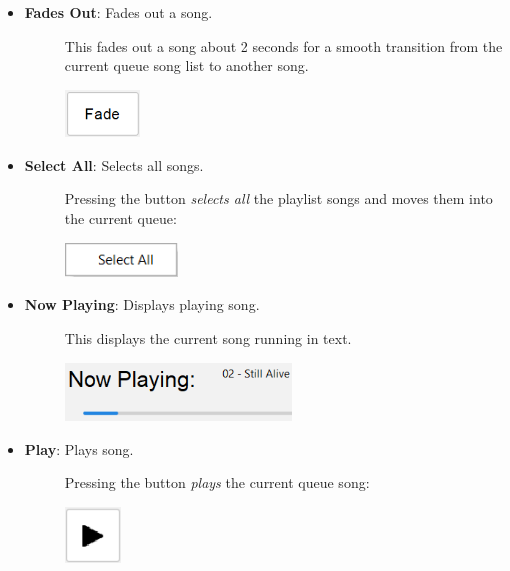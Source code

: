 \documentclass{article}
\begin{document}
\begin{itemize}
    \item \textbf{Fades Out}: Fades out a song.
    \begin{description}
        \item[] This fades out a song about 2 seconds for a smooth transition from the current queue song list to another song.
        \item[] \includegraphics[width=2cm]{Images/Fade.png}
    \end{description}
    
    
    \item \textbf{Select All}: Selects all songs.
    \begin{description}
        \item[] Pressing the button \textit{selects all} the playlist songs and moves them into the current queue:
        \item[] \includegraphics[width=3cm]{Images/Play Select All.png}
    \end{description}
    \item \textbf{Now Playing}: Displays playing song.
    \begin{description}
        \item[] This displays the current song running in text.
        \item[] \includegraphics[width=6cm]{Images/JBar Update 05 02 2023.png}
    \end{description}
    \item \textbf{Play}: Plays song.
    \begin{description}
        \item[] Pressing the button \textit{plays} the current queue song:
        \item[] \includegraphics[width=1.5cm]{Images/Play.png}

\end{description}
\end{itemize}
\end{document}
